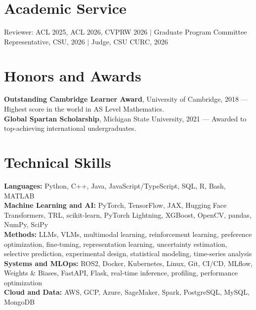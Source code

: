 \documentclass[9pt,letterpaper]{article}
\begin{document}
\section{Academic Service}
Reviewer: ACL 2025, ACL 2026, CVPRW 2026 $\mid$ Graduate Program Committee Representative, CSU, 2026 $\mid$ Judge, CSU CURC, 2026

\section{Honors and Awards}
\textbf{Outstanding Cambridge Learner Award}, University of Cambridge, 2018 --- Highest score in the world in AS Level Mathematics.\\
\textbf{Global Spartan Scholarship}, Michigan State University, 2021 --- Awarded to top-achieving international undergraduates.

\section{Technical Skills}
\textbf{Languages:} Python, C++, Java, JavaScript/TypeScript, SQL, R, Bash, MATLAB\\
\textbf{Machine Learning and AI:} PyTorch, TensorFlow, JAX, Hugging Face Transformers, TRL, scikit-learn, PyTorch Lightning, XGBoost, OpenCV, pandas, NumPy, SciPy\\
\textbf{Methods:} LLMs, VLMs, multimodal learning, reinforcement learning, preference optimization, fine-tuning, representation learning, uncertainty estimation, selective prediction, experimental design, statistical modeling, time-series analysis\\
\textbf{Systems and MLOps:} ROS2, Docker, Kubernetes, Linux, Git, CI/CD, MLflow, Weights \& Biases, FastAPI, Flask, real-time inference, profiling, performance optimization\\
\textbf{Cloud and Data:} AWS, GCP, Azure, SageMaker, Spark, PostgreSQL, MySQL, MongoDB
\end{document}
